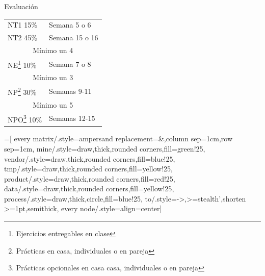 \documentclass[14pt]{beamer}
\begin{document}
\begin{frame}{Evaluación}
  \begin{center}
    \begin{tabular}{ll}
      \alert{NT1} 15\% & Semana 5 o 6\\
      \alert{NT2} 45\% & Semana 15 o 16\\
      \multicolumn{2}{c}{\alert{Mínimo un 4}}\\
      \hline
      \alert{NE}\footnote{Ejercicios entregables en clase} 10\% & Semana 7 o 8\\
      \multicolumn{2}{c}{\alert{Mínimo un 3}}\\
      \hline
      \alert{NP}\footnote{Prácticas en casa, individuales o en pareja} 30\% & Semanas 9-11\\
      \multicolumn{2}{c}{\alert{Mínimo un 5}}\\
      \hline
      \alert{NPO}\footnote{Prácticas opcionales en casa casa, individuales o en pareja} 10\% & Semanas 12-15
    \end{tabular}
  \end{center}
\end{frame}

=[
    every matrix/.style={ampersand replacement=\&,column sep=1cm,row sep=1cm},
    mine/.style={draw,thick,rounded corners,fill=green!25},
    vendor/.style={draw,thick,rounded corners,fill=blue!25},
    tmp/.style={draw,thick,rounded corners,fill=yellow!25},
    product/.style={draw,thick,rounded corners,fill=red!25},
    data/.style={draw,thick,rounded corners,fill=yellow!25},
    process/.style={draw,thick,circle,fill=blue!25},
    to/.style={->,>=stealth',shorten >=1pt,semithick},
    every node/.style={align=center}]
\end{document}
